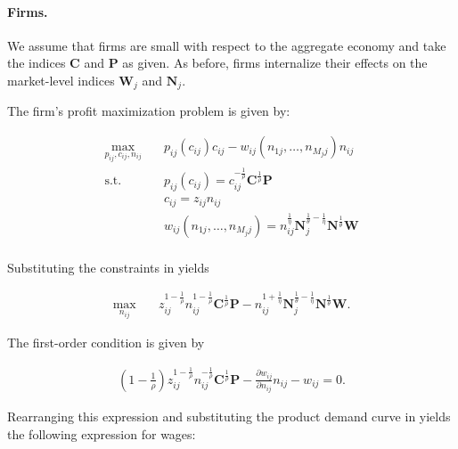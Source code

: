 \documentclass[12pt]{article}
\theoremstyle{prop}
\begin{document}
\paragraph{Firms.} We assume that firms are small with respect to the aggregate economy and take the indices $\mathbf{C}$ and $\mathbf{P}$ as given. As before, firms internalize their effects on the market-level indices $\mathbf{W}_{j}$ and $\mathbf{N}_{j}$.  

The firm's profit maximization problem is given by:

\begin{equation*}
    \begin{aligned}
        \max_{p_{ij}, c_{ij}, n_{ij}} \quad  & p_{ij}(c_{ij}) c_{ij} - w_{ij}(n_{1j}, \ldots, n_{M_{j}j}) n_{ij}\\
        \text{s.t.} \quad & p_{ij}(c_{ij}) = c_{ij}^{-\frac{1}{\rho}} \mathbf{C}^{\frac{1}{\rho}} \mathbf{P} \\
        &c_{ij} = z_{ij} n_{ij}\\
        &w_{ij}(n_{1j}, \ldots, n_{M_{j}j}) = n_{ij}^{\frac{1}{\eta}} \textbf{N}_{j}^{\frac{1}{\theta} - \frac{1}{\eta}} \textbf{N}^{\frac{1}{\theta}} \textbf{W}\\
    \end{aligned}
\end{equation*}

Substituting the constraints in yields 

\begin{equation} \label{eq:profitmax_productmarket}
    \begin{aligned}
        \max_{n_{ij}}\quad  & z_{ij}^{1-\frac{1}{\rho}} n_{ij}^{1-\frac{1}{\rho}} \mathbf{C}^{\frac{1}{\rho}} \mathbf{P} - n_{ij}^{1+\frac{1}{\eta}} \textbf{N}_{j}^{\frac{1}{\theta} - \frac{1}{\eta}} \textbf{N}^{\frac{1}{\theta}} \textbf{W}.
    \end{aligned}
\end{equation}

The first-order condition is given by

\begin{equation*}
    \begin{aligned}
        \left(1-\frac{1}{\rho}\right) z_{ij}^{1-\frac{1}{\rho}} n_{ij}^{-\frac{1}{\rho}} \mathbf{C}^{\frac{1}{\rho}} \mathbf{P} - \frac{\partial w_{ij}}{\partial n_{ij}} n_{ij} - w_{ij} = 0.
    \end{aligned}
\end{equation*}

Rearranging this expression and substituting the product demand curve in yields the following expression for wages: 
\end{document}
